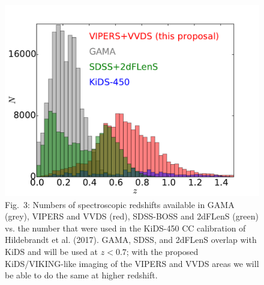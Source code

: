 \documentclass{article}[11pt]
\begin{document}
\begin{figure}
 \begin{minipage}[c]{0.55\textwidth}
  \includegraphics[width=\textwidth]{ESO_prop_plot_zdist.pdf}
  \end{minipage}\hfill
  \begin{minipage}[c]{0.40\textwidth}
    \caption*{Fig.~3: Numbers of spectroscopic redshifts available in GAMA (grey), VIPERS and VVDS (red), SDSS-BOSS and 2dFLenS (green) vs. the number that were used in the KiDS-450 CC calibration of Hildebrandt et al. (2017). GAMA, SDSS, and 2dFLenS overlap with KiDS and will be used at $z<0.7$; with the proposed KiDS/VIKING-like imaging of the VIPERS and VVDS areas we will be able to do the same at higher redshift.}
  \end{minipage}
\end{figure}
\end{document}
